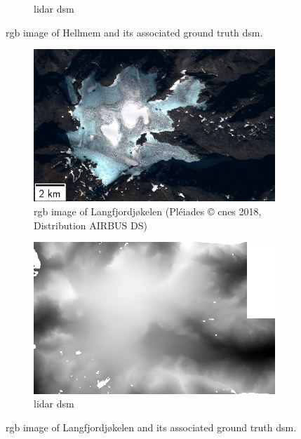 \begin{figure}
\begin{subfigure}[t]{0.48\linewidth}
        \caption{\acrshort{lidar} \acrshort{dsm}}
        \label{fig:miniature_Hellmem_gt}
    \end{subfigure}
    \caption{\acrshort{rgb} image of Hellmem and its associated ground truth \acrshort{dsm}.}
    \label{fig:miniature_Hellmem}
\end{figure}

\begin{figure}
    \centering
    \begin{subfigure}[t]{0.48\linewidth}
        \flushleft
        \includegraphics[width=\linewidth]{Images/Chap_6/miniature_Langfjordjokelen.png}
        \caption{\acrshort{rgb} image of Langfjordjøkelen (Pléiades © \acrshort{cnes} 2018, Distribution AIRBUS DS)}
        \label{fig:miniature_Langfjordjokelen_rgb}
    \end{subfigure}\hfill
    \begin{subfigure}[t]{0.48\linewidth}
        \flushright
        \includegraphics[width=\linewidth]{Images/Chap_6/miniature_Langfjordjokelen_gt.png}
        \caption{\acrshort{lidar} \acrshort{dsm}}
        \label{fig:miniature_Langfjordjokelen_gt}
    \end{subfigure}
    \caption{\acrshort{rgb} image of Langfjordjøkelen and its associated ground truth \acrshort{dsm}.}
    \label{fig:miniature_Langfjordjokelen}
\end{figure}

